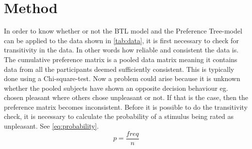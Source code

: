 \section*{Method}
\label{Method}
%
In order to know whether or not the BTL model and the Preference Tree-model can be applied to the data shown in \autoref{tab:data}, it is first necessary to check for transitivity in the data. In other words how reliable and consistent the data is. The cumulative preference matrix is a pooled data matrix meaning it contains data from all the participants deemed sufficiently consistent. This is typically done using a Chi-square-test. Now a problem could arise because it is unknown whether the pooled subjects have shown an opposite decision behaviour eg. chosen pleasant where others chose unpleasant or not. If that is the case, then the preference matrix becomes inconsistent. Before it is possible to do the transitivity check, it is necessary to calculate the probability of a stimulus being rated as unpleasant. See \autoref{eq:probability}.
%
\begin{equation}
p = \frac{freq}{n}
\label{eq:probability}
\end{equation}

